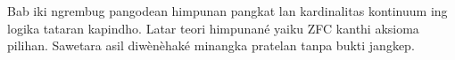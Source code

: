 \documentclass[../../../include/open-logic-chapter]{subfiles}
\begin{document}

\begin{editorial}
Bab iki ngrembug pangodean himpunan pangkat lan kardinalitas kontinuum ing logika tataran kapindho. Latar teori himpunané yaiku ZFC kanthi aksioma pilihan. Sawetara asil diwènèhaké minangka pratelan tanpa bukti jangkep.
\end{editorial}





\OLEndChapterHook
\end{document}
